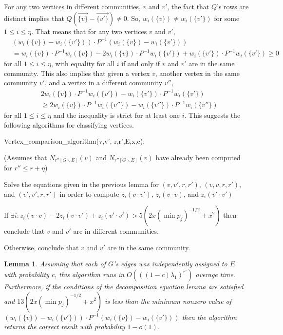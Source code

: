\documentclass[11pt]{article}
\newcommand{\1}{\mathbb{1}}
\newtheorem{lemma}{Lemma}
\begin{document}
For any two vertices in different communities, $v$ and $v'$, the fact that $Q$'s rows are distinct implies that $Q(\overrightarrow{\{v\}}-\overrightarrow{\{v'\}})\ne 0$. So, $w_i(\{v\})\ne w_i(\{v'\})$ for some $1\le i\le \eta$. That means that for any two vertices $v$ and $v'$,  
\begin{align*}
&(w_i(\{v\})- w_i(\{v'\}))\cdot P^{-1}(w_i(\{v\})- w_i(\{v'\}))\\
&=w_i(\{v\})\cdot P^{-1}w_i(\{v\})-2w_i(\{v\})\cdot P^{-1}w_i(\{v'\})+w_i(\{v'\})\cdot P^{-1}w_i(\{v'\})\ge 0
\end{align*}
for all $1\le i\le \eta$, with equality for all $i$ if and only if $v$ and $v'$ are in the same community. This also implies that given a vertex $v$, another vertex in the same community $v'$, and a vertex in a different community $v''$, 
\begin{align*}
&2w_i(\{v\})\cdot P^{-1}w_i(\{v'\})-w_i(\{v'\})\cdot P^{-1}w_i(\{v'\}) \\&\ge 2w_i(\{v\})\cdot P^{-1}w_i(\{v''\})-w_i(\{v''\})\cdot P^{-1}w_i(\{v''\})
\end{align*}
 for all $1\le i\le \eta$ and the inequality is strict for at least one $i$. This suggests the following algorithms for classifying vertices.

\begin{algorithm}
Vertex\_comparison\_algorithm(v,v', r,r',E,x,c):

(Assumes that $N_{r''[G\backslash E]}(v)$ and $N_{r''[G\backslash E]}(v)$ have already been computed for $r''\le r+\eta$)

\phantom{xxx} Solve the equations given in the previous lemma for $(v,v',r,r')$, $(v,v,r,r')$, and  $(v',v',r,r')$ in order to compute $z_i(v\cdot v')$, $z_i(v\cdot v)$, and $z_i(v'\cdot v')$ 

\phantom{xxx} If $\exists i: z_i(v\cdot v)-2z_i(v\cdot v')+z_i(v'\cdot v')> 5(2x(\min p_j)^{-1/2}+x^2)$ then conclude that $v$ and $v'$ are in different communities.

\phantom{xxx} Otherwise, conclude that $v$ and $v'$ are in the same community.
\end{algorithm}

\begin{lemma}
Assuming that each of $G$'s edges was independently assigned to $E$ with probability $c$, this algorithm runs in $O(((1-c)\lambda_1)^{r'})$ average time. Furthermore, if the conditions of the decomposition equation lemma are satisfied and $13(2x(\min p_j)^{-1/2}+x^2)$ is less than the minimum nonzero value of $(w_i(\{v\})- w_i(\{v'\}))\cdot P^{-1}(w_i(\{v\})- w_i(\{v'\}))$ then the algorithm returns the correct result with probability $1-o(1)$.
\end{lemma}
\end{document}

